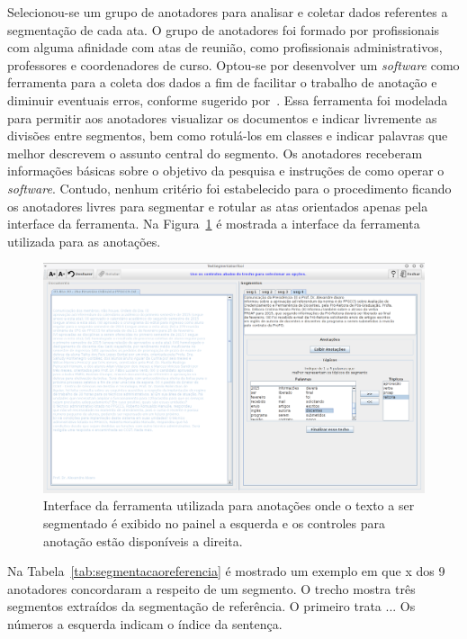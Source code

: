 Selecionou-se um grupo de anotadores para analisar e coletar dados referentes a segmentação de cada ata. O grupo de anotadores foi formado por profissionais com alguma afinidade com atas de reunião, como profissionais administrativos, professores e coordenadores de curso. Optou-se por desenvolver um \textit{software} como ferramenta para a coleta dos dados a fim de facilitar o trabalho de anotação e diminuir eventuais erros, conforme sugerido por~\cite{Hovy2010}. Essa ferramenta foi modelada para permitir aos anotadores visualizar os documentos e indicar livremente as divisões entre segmentos, bem como rotulá-los em classes e indicar palavras que melhor descrevem o assunto central do segmento.
Os anotadores receberam informações básicas sobre o objetivo da pesquisa e instruções de como operar o \textit{software}. Contudo, nenhum critério foi estabelecido para o procedimento ficando os anotadores livres para segmentar e rotular as atas orientados apenas pela interface da ferramenta. Na Figura~\ref{fig:interfaceanotacoes} é mostrada a interface da ferramenta utilizada para as anotações.

  \begin{figure}[!h]
	  \centering
	  \includegraphics[width=1\textwidth]{conteudo/capitulos/figs/interface-anotacoes.png}
	  \caption{Interface da ferramenta utilizada para anotações onde o texto a ser segmentado é exibido no painel a esquerda e os controles para anotação estão disponíveis a direita.}
	  \label{fig:interfaceanotacoes}
  \end{figure}





Na Tabela~\ref{tab:segmentacaoreferencia} é mostrado um exemplo em que x dos 9 anotadores concordaram a respeito de um segmento. O trecho mostra três segmentos extraídos da segmentação de referência. O primeiro trata ...
Os números a esquerda indicam o índice da sentença.

